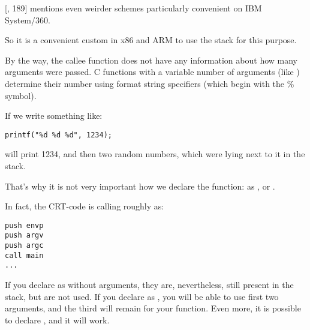 [\TAOCPvolI{}, 189] mentions even weirder schemes particularly convenient on IBM System/360.

So it is a convenient custom in x86 and ARM to use the stack for this purpose.

\par
By the way, the \gls{callee} function does not have any information about how many arguments were passed.
C functions with a variable number of arguments (like \printf) determine their number using format string specifiers (which begin with the \% symbol).

If we write something like:

\begin{lstlisting}
printf("%d %d %d", 1234);
\end{lstlisting}

\printf will print 1234, and then two random numbers, which were lying next to it in the stack.

\par
That's why it is not very important how we declare the \main function: as \main,  or .

In fact, the \ac{CRT}-code is calling \main roughly as:
	
\begin{lstlisting}
push envp
push argv
push argc
call main
...
\end{lstlisting}

If you declare \main as \main without arguments, they are, nevertheless, still present in the stack, but are not used.
If you declare \main as  ,
you will be able to use first two arguments, and the third will remain  for your function.
Even more, it is possible to declare , and it will work.

